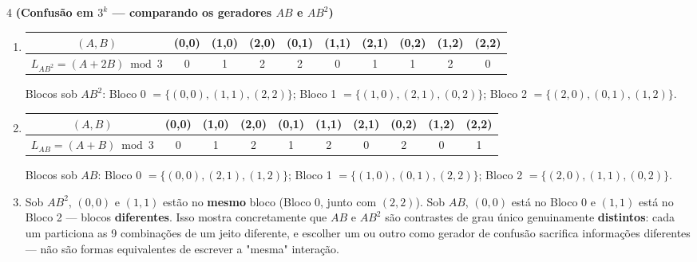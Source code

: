\documentclass[11pt]{article}
\begin{document}
\begin{questao}{4} \textbf{(Confusão em $3^k$ --- comparando os geradores $AB$ e $AB^2$)}
\end{questao}
\begin{solucao}
\begin{enumerate}[label=(\alph*)]
  \item
  \begin{center}
  \begin{tabular}{c|ccccccccc}
  $(A,B)$ & (0,0) & (1,0) & (2,0) & (0,1) & (1,1) & (2,1) & (0,2) & (1,2) & (2,2) \\ \hline
  $L_{AB^2}=(A+2B)\bmod3$ & 0 & 1 & 2 & 2 & 0 & 1 & 1 & 2 & 0
  \end{tabular}
  \end{center}
  Blocos sob $AB^2$: Bloco 0 $=\{(0,0),(1,1),(2,2)\}$; Bloco 1 $=\{(1,0),(2,1),(0,2)\}$;
  Bloco 2 $=\{(2,0),(0,1),(1,2)\}$.
  \item
  \begin{center}
  \begin{tabular}{c|ccccccccc}
  $(A,B)$ & (0,0) & (1,0) & (2,0) & (0,1) & (1,1) & (2,1) & (0,2) & (1,2) & (2,2) \\ \hline
  $L_{AB}=(A+B)\bmod3$ & 0 & 1 & 2 & 1 & 2 & 0 & 2 & 0 & 1
  \end{tabular}
  \end{center}
  Blocos sob $AB$: Bloco 0 $=\{(0,0),(2,1),(1,2)\}$; Bloco 1 $=\{(1,0),(0,1),(2,2)\}$;
  Bloco 2 $=\{(2,0),(1,1),(0,2)\}$.
  \item Sob $AB^2$, $(0,0)$ e $(1,1)$ estão no \textbf{mesmo} bloco (Bloco 0, junto com $(2,2)$).
    Sob $AB$, $(0,0)$ está no Bloco 0 e $(1,1)$ está no Bloco 2 --- blocos
    \textbf{diferentes}. Isso mostra concretamente que $AB$ e $AB^2$ são contrastes de grau único
    genuinamente \textbf{distintos}: cada um particiona as 9 combinações de um jeito diferente, e
    escolher um ou outro como gerador de confusão sacrifica informações diferentes --- não são
    formas equivalentes de escrever a "mesma" interação.
\end{enumerate}
\end{solucao}
\end{document}
